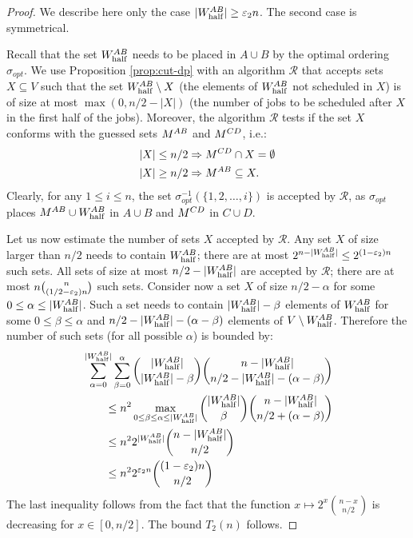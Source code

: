 \documentclass{article}
\theoremstyle{definition}
\begin{document}
\begin{proof}
We describe here only the case $|W_{\mathrm{half}}^{AB}| \geq \varepsilon_2 n$. The second case is symmetrical.

Recall that the set $W_{\mathrm{half}}^{AB}$ needs to be placed in $A \cup B$ by the optimal ordering $\sigma_{opt}$.
We use Proposition \ref{prop:cut-dp} with an algorithm $\mathcal{R}$ that accepts sets $X \subseteq V$
such that the set $W_{\mathrm{half}}^{AB} \setminus X$ (the elements of $W_{\mathrm{half}}^{AB}$ not scheduled in $X$) is of size at most $\max(0, n/2 - |X|)$ (the number
of jobs to be scheduled after $X$ in the first half of the jobs).
Moreover, the algorithm $\mathcal{R}$ tests if the set $X$ conforms with the guessed sets $M^{AB}$ and $M^{CD}$, i.e.:
\begin{align*}
|X| \leq n/2 & \Rightarrow M^{CD} \cap X = \emptyset \\
|X| \geq n/2 & \Rightarrow M^{AB} \subseteq X.
\end{align*}
Clearly, for any $1 \leq i \leq n$, the set $\sigma_{opt}^{-1}(\{1,2,\ldots,i\})$ is accepted by $\mathcal{R}$,
as $\sigma_{opt}$ places $M^{AB} \cup W_{\mathrm{half}}^{AB}$ in $A \cup B$ and $M^{CD}$ in $C \cup D$.

Let us now estimate the number of sets $X$ accepted by $\mathcal{R}$. Any set $X$ of size larger than $n/2$ needs to contain $W_{\mathrm{half}}^{AB}$; there are
at most $2^{n-|W_{\mathrm{half}}^{AB}|} \leq 2^{(1-\varepsilon_2)n}$ such sets. All sets of size at most $n/2 - |W_{\mathrm{half}}^{AB}|$ are accepted by $\mathcal{R}$; there
are at most $n\binom{n}{(1/2 - \varepsilon_2)n}$ such sets. 
Consider now a set $X$ of size $n/2 - \alpha$ for some $0 \leq \alpha \leq |W_{\mathrm{half}}^{AB}|$. Such a set needs to contain
$|W_{\mathrm{half}}^{AB}|-\beta$ elements of $W_{\mathrm{half}}^{AB}$ for some $0 \leq \beta \leq \alpha$ and $n/2 - |W_{\mathrm{half}}^{AB}| - (\alpha-\beta)$ elements of $V \setminus W_{\mathrm{half}}^{AB}$.
Therefore the number of such sets (for all possible $\alpha$) is bounded by:
\begin{align*}
&\sum_{\alpha=0}^{|W_{\mathrm{half}}^{AB}|} \sum_{\beta=0}^\alpha \binom{|W_{\mathrm{half}}^{AB}|}{|W_{\mathrm{half}}^{AB}|-\beta} \binom{n-|W_{\mathrm{half}}^{AB}|}{n/2-|W_{\mathrm{half}}^{AB}|-(\alpha-\beta)} \\
&\qquad \leq n^2 \max_{0 \leq \beta \leq \alpha \leq |W_{\mathrm{half}}^{AB}|} \binom{|W_{\mathrm{half}}^{AB}|}{\beta} \binom{n-|W_{\mathrm{half}}^{AB}|}{n/2 + (\alpha-\beta)} \\
&\qquad \leq n^2 2^{|W_{\mathrm{half}}^{AB}|} \binom{n-|W_{\mathrm{half}}^{AB}|}{n/2} \\
&\qquad \leq n^2 2^{\varepsilon_2 n} \binom{(1-\varepsilon_2)n}{n/2}
\end{align*}
The last inequality follows from the fact that the function $x \mapsto 2^x \binom{n-x}{n/2}$ is decreasing for $x \in [0,n/2]$.
The bound $T_2(n)$ follows.


\end{proof}
\end{document}
